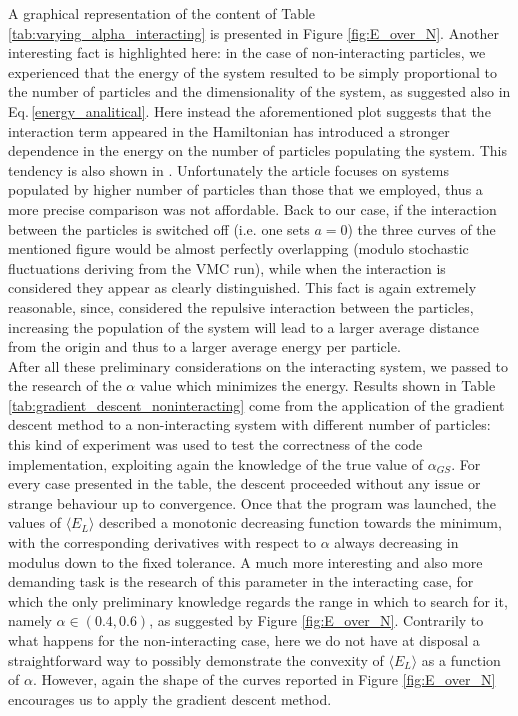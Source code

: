 A graphical representation of the content of Table \ref{tab:varying_alpha_interacting} is presented in Figure \ref{fig:E_over_N}. Another interesting fact is highlighted here: in the case of non-interacting particles, we experienced that the energy of the system resulted to be simply proportional to the number of particles and the dimensionality of the system, as suggested also in Eq.\,\ref{energy_analitical}. Here instead the aforementioned plot suggests that the interaction term appeared in the Hamiltonian has introduced a stronger dependence in the energy on the number of particles populating the system. This tendency is also shown in \cite{duBois}. Unfortunately the article focuses on systems populated by higher number of particles than those that we employed, thus a more precise comparison was not affordable. Back to our case, if the interaction between the particles is switched off (i.e. one sets $a=0$) the three curves of the mentioned figure would be almost perfectly overlapping (modulo stochastic fluctuations deriving from the VMC run), while when the interaction is considered they appear as clearly distinguished. This fact is again extremely reasonable, since, considered the repulsive interaction between the particles, increasing the population of the system will lead to a larger average distance from the origin and thus to a larger average energy per particle. \\

After all these preliminary considerations on the interacting system, we passed to the research of the $\alpha$ value which minimizes the energy. Results shown in Table \ref{tab:gradient_descent_noninteracting} come from the application of the gradient descent method to a non-interacting system with different number of particles: this kind of experiment was used to test the correctness of the code implementation, exploiting again the knowledge of the true value of $\alpha_{GS}$. For every case presented in the table, the descent proceeded without any issue or strange behaviour up to convergence. Once that the program was launched, the values of $\langle E_L \rangle$ described a monotonic decreasing function towards the minimum, with the corresponding derivatives with respect to $\alpha$ always decreasing in modulus down to the fixed tolerance. A much more interesting and also more demanding task is the research of this parameter in the interacting case, for which the only preliminary knowledge regards the range in which to search for it, namely $\alpha\in(0.4, 0.6)$, as suggested by Figure \ref{fig:E_over_N}. Contrarily to what happens for the non-interacting case, here we do not have at disposal a straightforward way to possibly demonstrate the convexity of $\langle E_L \rangle$ as a function of $\alpha$. However, again the shape of the curves reported in Figure \ref{fig:E_over_N} encourages us to apply the gradient descent method. 

